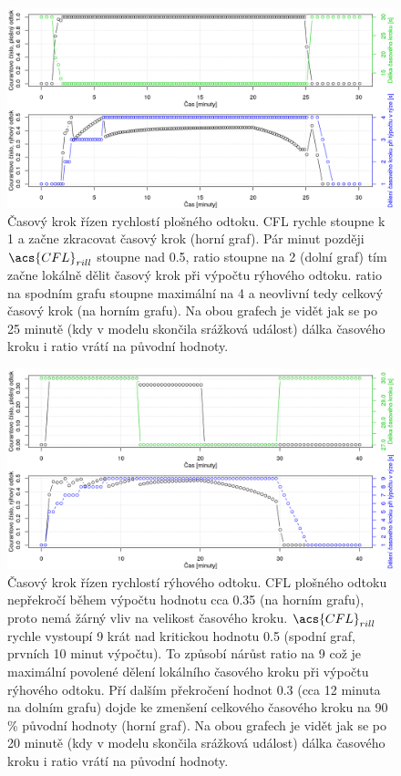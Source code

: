   
  \begin{figure}[h!]
    \centering
    \includegraphics[width=1.0\textwidth]{./img/courantratio.png}
    \caption{Časový krok řízen rychlostí plošného odtoku. \acs{CFL} rychle stoupne k 1 a začne zkracovat časový krok (horní graf). Pár minut později $\acs{CFL}_{rill}$ stoupne nad 0.5, \acs{ratio} stoupne na 2 (dolní graf) tím začne lokálně dělit časový krok při výpočtu rýhového odtoku. \acs{ratio} na spodním grafu stoupne maximální na 4 a neovlivní tedy celkový časový krok (na horním grafu). Na obou grafech je vidět jak se po 25 minutě (kdy v modelu skončila srážková událost) dálka časového kroku i \acs{ratio} vrátí na původní hodnoty.}
    \label{fig:cfl1}
  \end{figure}
  
  
  \begin{figure}[h!]
    \centering
    \includegraphics[width=1.0\textwidth]{./img/courantratio2.png}
    \caption{Časový krok řízen rychlostí rýhového odtoku.  \acs{CFL} plošného odtoku nepřekročí během výpočtu hodnotu cca 0.35 (na horním grafu), proto nemá žárný vliv na velikost časového kroku.  $\acs{CFL}_{rill}$ rychle vystoupí 9 krát nad kritickou hodnotu 0.5 (spodní graf, prvních 10 minut výpočtu). To způsobí nárůst \acs{ratio} na 9 což je maximální povolené dělení lokálního časového kroku při výpočtu rýhového odtoku. Pří dalším překročení hodnot 0.3 (cca 12 minuta na dolním grafu) dojde ke zmenšení celkového časového kroku na 90 \% původní hodnoty (horní graf). Na obou grafech je vidět jak se po 20 minutě (kdy v modelu skončila srážková událost) dálka časového kroku i \acs{ratio} vrátí na původní hodnoty.}
    \label{fig:cfl2}
  \end{figure}
  

